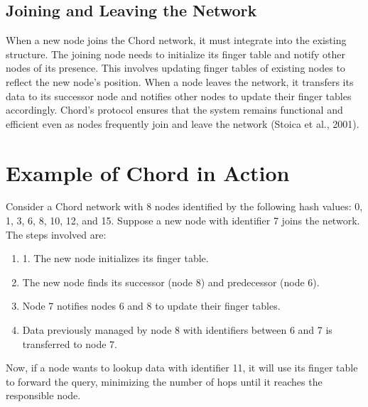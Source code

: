 \subsection{Joining and Leaving the Network}
When a new node joins the Chord network, it must integrate into the existing structure.
The joining node needs to initialize its finger table and notify other nodes of its presence.
This involves updating finger tables of existing nodes to reflect the new node's position.
When a node leaves the network, it transfers its data to its successor node and notifies other nodes to update their finger tables accordingly.
Chord's protocol ensures that the system remains functional and efficient even as nodes frequently join and leave the network (Stoica et al., 2001).

\section{Example of Chord in Action}
Consider a Chord network with 8 nodes identified by the following hash values: 0, 1, 3, 6, 8, 10, 12, and 15.
Suppose a new node with identifier 7 joins the network.
The steps involved are:
\begin{enumerate}
    \item 1. The new node initializes its finger table.
    \item The new node finds its successor (node 8) and predecessor (node 6).
    \item Node 7 notifies nodes 6 and 8 to update their finger tables.
    \item Data previously managed by node 8 with identifiers between 6 and 7 is transferred to node 7.
\end{enumerate}

Now, if a node wants to lookup data with identifier 11, it will use its finger table to forward the query, minimizing the number of hops until it reaches the responsible node.